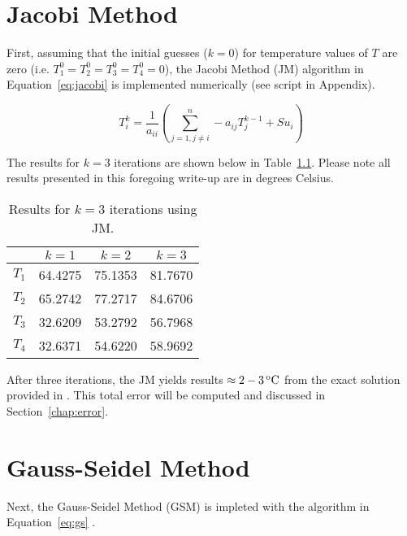 \chapter{Jacobi Method}
\label{chap:jacobi}

First, assuming that the initial guesses ($k=0$) for temperature values of $T$ are zero (i.e. $T_1^0=T_2^0=T_3^0=T_4^0=0$), the Jacobi Method (JM) algorithm in Equation~\ref{eq:jacobi} \cite{cfdbook} is implemented numerically (see script \cite{python} in Appendix).

\begin{equation}
	\label{eq:jacobi}	
	T_i^k = \frac{1}{a_{ii}} \left( \sum_{j=1, j \neq i}^{n} - a_{ij} T_j^{k-1}  + Su_i \right)
\end{equation}

The results for $k=3$ iterations are shown below in Table~\ref{tab:jac}. Please note all results presented in this foregoing write-up are in degrees Celsius.

\begin{table}[H]
  \centering
  \caption{Results for $k=3$ iterations using JM.}
    \begin{tabular}{cccc}
    \hline
    & \textbf{$k=1$} & \textbf{$k=2$} & \textbf{$k=3$} \\
    \midrule
    \textbf{$T_1$} & 64.4275 & 75.1353 & 81.7670 \\
    \textbf{$T_2$} & 65.2742 & 77.2717 & 84.6706 \\
    \textbf{$T_3$} & 32.6209 & 53.2792 & 56.7968 \\
    \textbf{$T_4$} & 32.6371 & 54.6220 & 58.9692 \\
    \hline
    \end{tabular}
  \label{tab:jac}
\end{table}

After three iterations, the JM yields results $\approx 2-3 \,\mathrm{^o C}$ from the exact solution provided in \cite{assign}. This total error will be computed and discussed in Section~\ref{chap:error}. \\

\chapter{Gauss-Seidel Method}
\label{chap:gauss}

Next, the Gauss-Seidel Method (GSM) is impleted with the algorithm in Equation~\ref{eq:gs} \cite{cfdbook}.

